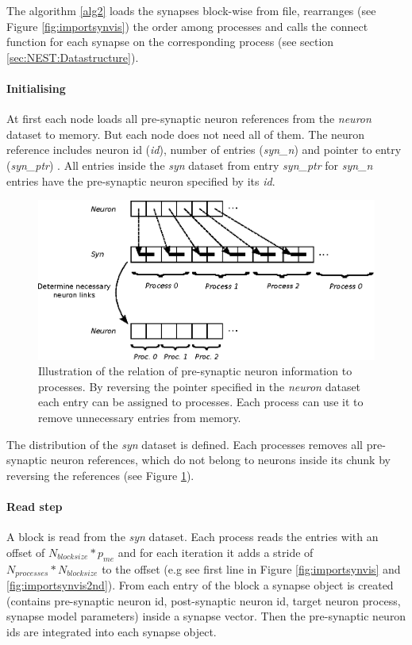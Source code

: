 The algorithm \ref{alg2} loads the synapses block-wise from file, rearranges (see Figure \ref{fig:importsynvis}) the order
among processes and calls the connect function for each synapse on the corresponding process (see section \ref{sec:NEST:Datastructure}).

\newpage
\paragraph{Initialising}
At first each node loads all pre-synaptic neuron references from the \emph{neuron} dataset to memory.
But each node does not need all of them. 
The neuron reference includes neuron id (\emph{id}), number of entries  (\emph{syn\_n}) and pointer to entry (\emph{syn\_ptr}) .
All entries inside the \emph{syn} dataset from  entry \emph{syn\_ptr} for \emph{syn\_n} entries have the pre-synaptic neuron specified by its \emph{id}.
\begin{figure}[ht!]
\centering
\includegraphics[scale=1.0]{pictures/NeuronLinksRemoving.eps}
\caption{Illustration of the relation of pre-synaptic neuron information to processes.
By reversing the pointer specified in the \emph{neuron} dataset
each entry can be assigned to processes.
Each process can use it to remove unnecessary entries from memory.
}
\label{fig:neuonlinksremoving}
\end{figure}
The distribution of the \emph{syn} dataset is defined.
Each processes removes all pre-synaptic neuron references, which do not belong to
neurons inside its chunk by reversing the references (see Figure \ref{fig:neuonlinksremoving}).

\paragraph{Read step}
A block is read from the \emph{syn} dataset.
Each process reads the entries with an offset of $N_{blocksize} * p_{me}$ and
for each iteration it adds a stride of $N_{processes} * N_{blocksize}$  to the offset (e.g see first line in Figure \ref{fig:importsynvis} and \ref{fig:importsynvis2nd}).
From each entry of the block a synapse object is created
(contains pre-synaptic neuron id, post-synaptic neuron id, target neuron process, synapse model parameters)
inside a synapse vector. Then the pre-synaptic neuron ids are integrated into each synapse object.

